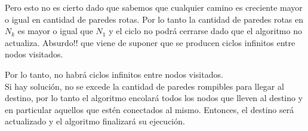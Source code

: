 Pero esto no es cierto dado que sabemos que cualquier camino es creciente mayor o igual en cantidad de paredes rotas. 
Por lo tanto la cantidad de paredes rotas en $N_k$ es mayor o igual que $N_1$ y el ciclo no podrá cerrarse dado que el algoritmo no actualiza. Absurdo!! que viene de suponer que se producen ciclos infinitos entre nodos visitados.

Por lo tanto, no habrá ciclos infinitos entre nodos visitados.\\

Si hay solución, no se excede la cantidad de paredes rompibles para llegar al destino, por lo tanto el algoritmo encolará todos los nodos que lleven al destino y en particular aquellos que estén conectados al mismo. Entonces, el destino será actualizado y el algoritmo finalizará su ejecución.